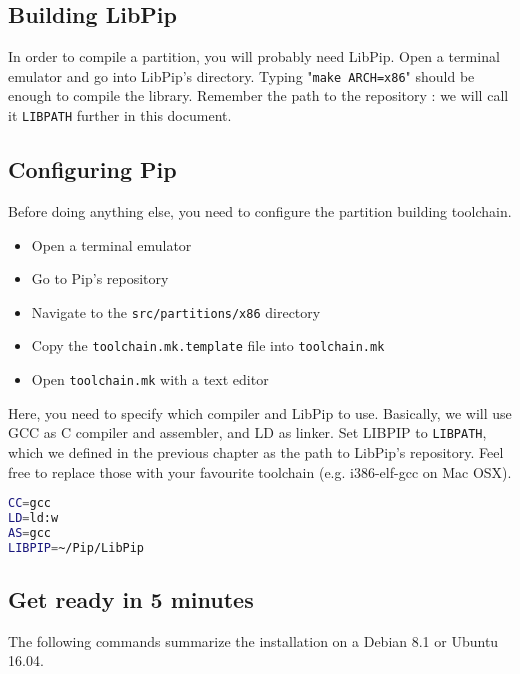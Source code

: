 \documentclass[10pt,a4paper,titlepage]{refart}
\begin{document}
\subsection{Building LibPip}
In order to compile a partition, you will probably need LibPip.
Open a terminal emulator and go into LibPip's directory. Typing
"\texttt{make ARCH=x86}" should be enough to compile the library. Remember the
path to the repository : we will call it \texttt{LIBPATH} further in this document.

\subsection{Configuring Pip}
Before doing anything else, you need to configure the partition building toolchain.
\begin{itemize}
\item Open a terminal emulator
\item Go to Pip's repository
\item Navigate to the \texttt{src/partitions/x86} directory
\item Copy the \texttt{toolchain.mk.template} file into \texttt{toolchain.mk}
\item Open \texttt{toolchain.mk} with a text editor
\end{itemize}

Here, you need to specify which compiler and LibPip to
use. Basically, we will use GCC as C compiler and assembler, and LD as linker. Set LIBPIP to \texttt{LIBPATH}, which we defined in the previous chapter as the path to LibPip's repository. Feel free to replace those with your favourite toolchain (e.g. i386-elf-gcc on Mac OSX).
\begin{lstlisting}[language=bash,caption={\texttt{toolchain.mk} configuration}]
CC=gcc
LD=ld:w
AS=gcc
LIBPIP=~/Pip/LibPip
\end{lstlisting}

\subsection{Get ready in 5 minutes}
\label{sec:getready}

The following commands summarize the installation on a Debian 8.1 or Ubuntu 16.04.
\end{document}
